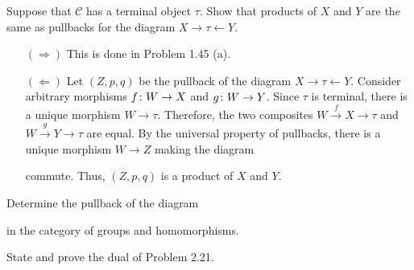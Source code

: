 \bx
Suppose that $\mathcal{C}$ has a terminal object $\tau$. Show that products of $X$ and $Y$ are the same as pullbacks for the diagram $X\to \tau \leftarrow Y$.
\ex

\bs
\begin{itemize}
\item[$(\Rightarrow)$]
This is done in Problem 1.45 (a).
\item[$(\Leftarrow)$]
Let $(Z,p,q)$ be the pullback of the diagram $X\to\tau\leftarrow Y$. Consider arbitrary morphisms $f\colon W\to X$ and $g\colon W\to Y$. Since $\tau$ is terminal, there is a unique morphism $W\to \tau$. Therefore, the two composites $W\xrightarrow{\,f\,}X\to \tau$ and $W\xrightarrow{\,g\,}Y\to \tau$ are equal. By the universal property of pullbacks, there is a unique morphism $W\to Z$ making the diagram 
\bse
{}
\ese
commute. Thus, $(Z,p,q)$ is a product of $X$ and $Y$. 
\end{itemize}
\es

\bx
Determine the pullback of the diagram
\bse
{}
\ese
in the category of groups and homomorphisms.
\ex

\bs
\es

\bp
State and prove the dual of Problem 2.21.
\ep

